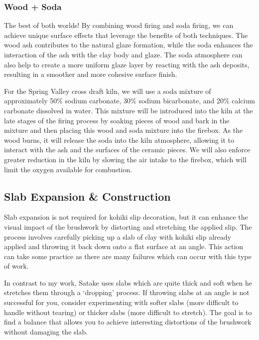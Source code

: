\documentclass[12pt]{scrartcl}
\begin{document}
\subsubsection*{Wood + Soda}
The best of both worlds! By combining wood firing and soda firing, we can achieve unique surface effects that leverage the benefits of both techniques. The wood ash contributes to the natural glaze formation, while the soda enhances the interaction of the ash with the clay body and glaze. The soda atmosphere can also help to create a more uniform glaze layer by reacting with the ash deposits, resulting in a smoother and more cohesive surface finish.

For the Spring Valley cross draft kiln, we will use a soda mixture of approximately 50\% sodium carbonate, 30\% sodium bicarbonate, and 20\% calcium carbonate dissolved in water. This mixture will be introduced into the kiln at the late stages of the firing process by soaking pieces of wood and bark in the mixture and then placing this wood and soda mixture into the firebox. As the wood burns, it will release the soda into the kiln atmosphere, allowing it to interact with the ash and the surfaces of the ceramic pieces.  We will also enforce greater reduction in the kiln by slowing the air intake to the firebox, which will limit the oxygen available for combustion. 

\subsection*{Slab Expansion \& Construction}
Slab expansion is not required for kohiki slip decoration, but it can enhance the visual impact of the brushwork by distorting and stretching the applied slip.  The process involves carefully picking up a slab of clay with kohiki slip already applied and throwing it back down onto a flat surface at an angle. This action can take some practice as there are many failures which can occur with this type of work.

In contrast to my work, Satake uses slabs which are quite thick and soft when he stretches them through a `dropping' process. If throwing slabs at an angle is not successful for you, consider experimenting with softer slabs (more difficult to handle without tearing) or thicker slabs (more difficult to stretch).  The goal is to find a balance that allows you to achieve interesting distortions of the brushwork without damaging the slab.
\end{document}
